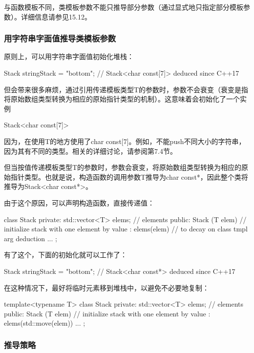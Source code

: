 与函数模板不同，类模板参数不能只推导部分参数（通过显式地只指定部分模板参数）。详细信息请参见15.12。

\subsubsection{用字符串字面值推导类模板参数}

原则上，可以用字符串字面值初始化堆栈：

\begin{cpp}
Stack stringStack = "bottom"; // Stack<char const[7]> deduced since C++17
\end{cpp}

但会带来很多麻烦，通过引用传递模板类型T的参数时，参数不会衰变（衰变是指将原始数组类型转换为相应的原始指针类型的机制）。这意味着会初始化了一个实例

\begin{cpp}
Stack<char const[7]>
\end{cpp}

因为，在使用T的地方使用了char const[7]。例如，不能push不同大小的字符串，因为其有不同的类型。相关的详细讨论，请参阅第7.4节。

但当按值传递模板类型T的参数时，参数会衰变，将原始数组类型转换为相应的原始指针类型。也就是说，构造函数的调用参数T推导为char const*，因此整个类将推导为Stack<char const*>。

由于这个原因，可以声明构造函数，直接传递值：

\begin{cpp}
class Stack {
private:
	std::vector<T> elems; // elements
public:
	Stack (T elem) // initialize stack with one element by value
	: elems({elem}) { // to decay on class tmpl arg deduction
	}
	...
};
\end{cpp}

有了这个，下面的初始化就可以工作了：

\begin{cpp}
Stack stringStack = "bottom"; // Stack<char const*> deduced since C++17
\end{cpp}

在这种情况下，最好将临时元素移到堆栈中，以避免不必要地复制：

\begin{cpp}
template<typename T>
class Stack {
private:
	std::vector<T> elems; // elements
public:
	Stack (T elem) // initialize stack with one element by value
	: elems({std::move(elem)}) {
	}
	...
};
\end{cpp}

\subsubsection{推导策略}

